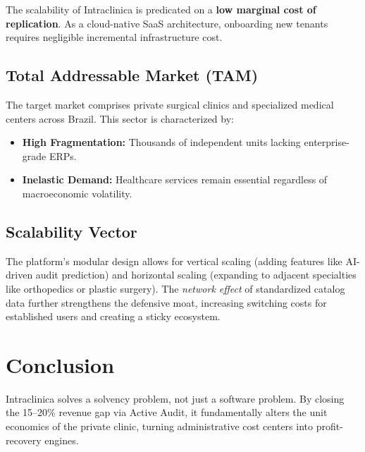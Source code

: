 \documentclass[12pt, openright, twoside, a4paper, english, french, spanish]{abntex2}
\begin{document}
The scalability of Intraclinica is predicated on a \textbf{low marginal cost of replication}. As a cloud-native SaaS architecture, onboarding new tenants requires negligible incremental infrastructure cost.

\subsection{Total Addressable Market (TAM)}
The target market comprises private surgical clinics and specialized medical centers across Brazil. This sector is characterized by:
\begin{itemize}
    \item \textbf{High Fragmentation:} Thousands of independent units lacking enterprise-grade ERPs.
    \item \textbf{Inelastic Demand:} Healthcare services remain essential regardless of macroeconomic volatility.
\end{itemize}

\subsection{Scalability Vector}
The platform's modular design allows for vertical scaling (adding features like AI-driven audit prediction) and horizontal scaling (expanding to adjacent specialties like orthopedics or plastic surgery). The \textit{network effect} of standardized catalog data further strengthens the defensive moat, increasing switching costs for established users and creating a sticky ecosystem.

\section{Conclusion}
Intraclinica solves a solvency problem, not just a software problem. By closing the 15--20\% revenue gap via Active Audit, it fundamentally alters the unit economics of the private clinic, turning administrative cost centers into profit-recovery engines.
\end{document}
